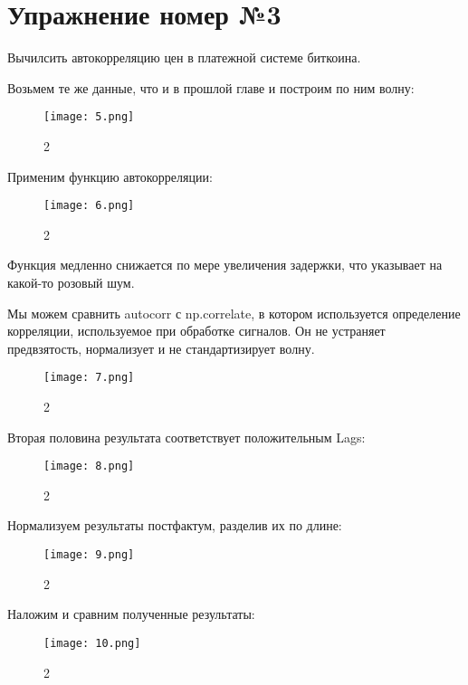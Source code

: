 \documentclass[10pt,a4paper,oneside]{article}
\begin{document}
\section{Упражнение номер №3}

Вычилсить автокорреляцию цен в платежной системе биткоина. 

Возьмем те же данные, что и в прошлой главе и построим по ним волну: 

\begin{figure}[H]
        \centering
        \texttt{[image: 5.png]}
        \caption{2}
        \label{fig:first}
\end{figure}

Применим функцию автокорреляции: 

\begin{figure}[H]
        \centering
        \texttt{[image: 6.png]}
        \caption{2}
        \label{fig:first}
\end{figure}

Функция медленно снижается по мере увеличения задержки, что указывает на какой-то розовый шум.

Мы можем сравнить autocorr с np.correlate, в котором используется определение корреляции, используемое при обработке сигналов. Он не устраняет предвзятость, нормализует и не стандартизирует волну.

\begin{figure}[H]
        \centering
        \texttt{[image: 7.png]}
        \caption{2}
        \label{fig:first}
\end{figure}

Вторая половина результата соответствует положительным Lags:

\begin{figure}[H]
        \centering
        \texttt{[image: 8.png]}
        \caption{2}
        \label{fig:first}
\end{figure}

Нормализуем результаты постфактум, разделив их по длине:

\begin{figure}[H]
        \centering
        \texttt{[image: 9.png]}
        \caption{2}
        \label{fig:first}
\end{figure}

Наложим и сравним полученные результаты: 

\begin{figure}[H]
        \centering
        \texttt{[image: 10.png]}
        \caption{2}
        \label{fig:first}
\end{figure}
\end{document}
